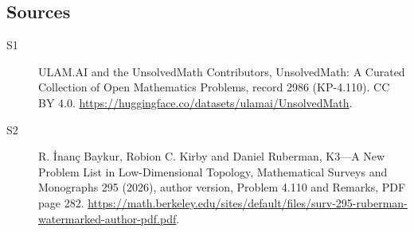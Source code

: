 \documentclass[11pt]{article}
\begin{document}
\subsection{Sources}
\begin{description}
\item[\hypertarget{source:2986:1}{S1}] ULAM.AI and the UnsolvedMath Contributors, UnsolvedMath: A Curated Collection of Open Mathematics Problems, record 2986 (KP-4.110). CC BY 4.0. \url{https://huggingface.co/datasets/ulamai/UnsolvedMath}.
\item[\hypertarget{source:2986:2}{S2}] R. İnanç Baykur, Robion C. Kirby and Daniel Ruberman, K3—A New Problem List in Low-Dimensional Topology, Mathematical Surveys and Monographs 295 (2026), author version, Problem 4.110 and Remarks, PDF page 282. \url{https://math.berkeley.edu/sites/default/files/surv-295-ruberman-watermarked-author-pdf.pdf}.
\end{description}
\label{end:2986}
\end{document}
